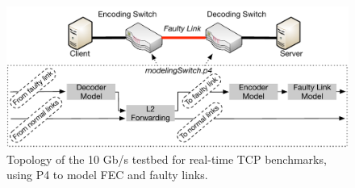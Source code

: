 
\begin{figure}
  \centering
  \includegraphics[width=0.40\paperwidth]{figures/lineRateModel.pdf}
  \caption{\label{fig:p4ModelTopo} Topology of the 10 Gb/s testbed 
  for real-time TCP benchmarks, using P4 to model FEC and faulty links.}
\end{figure}

